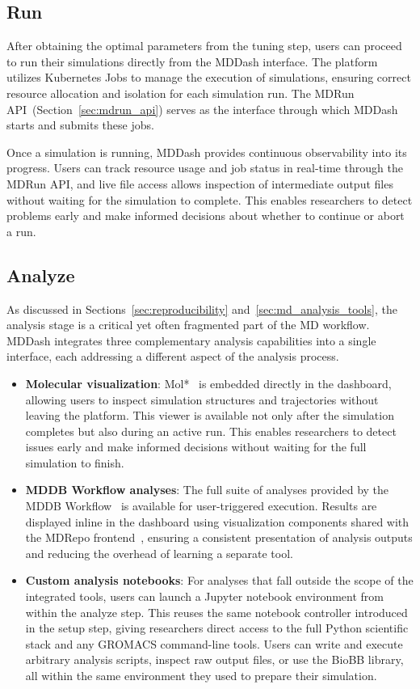 \documentclass[
  digital,     %
  color,       %
  oneside,     %
  nosansbold,  %
  nocolorbold, %
  lof,         %
  lot,         %
]{fithesis4}
\begin{document}
\subsection{Run}
\label{sec:step_run}

After obtaining the optimal parameters from the tuning step, users can proceed to run their simulations directly from the MDDash interface. The platform utilizes Kubernetes Jobs to manage the execution of simulations, ensuring correct resource allocation and isolation for each simulation run. The MDRun API~(Section~\ref{sec:mdrun_api}) serves as the interface through which MDDash starts and submits these jobs.

Once a simulation is running, MDDash provides continuous observability into its progress. Users can track resource usage and job status in real-time through the MDRun API, and live file access allows inspection of intermediate output files without waiting for the simulation to complete. This enables researchers to detect problems early and make informed decisions about whether to continue or abort a run.

\subsection{Analyze}
\label{sec:step_analyze}

As discussed in Sections~\ref{sec:reproducibility} and~\ref{sec:md_analysis_tools}, the analysis stage is a critical yet often fragmented part of the MD workflow. MDDash integrates three complementary analysis capabilities into a single interface, each addressing a different aspect of the analysis process.

\begin{itemize}
    \item \textbf{Molecular visualization}: Mol*~\cite{molstar_viewer} is embedded directly in the dashboard, allowing users to inspect simulation structures and trajectories without leaving the platform. This viewer is available not only after the simulation completes but also during an active run. This enables researchers to detect issues early and make informed decisions without waiting for the full simulation to finish.
    \item \textbf{MDDB Workflow analyses}: The full suite of analyses provided by the MDDB Workflow~\cite{mddb_covid} is available for user-triggered execution. Results are displayed inline in the dashboard using visualization components shared with the MDRepo frontend~\cite{mdrepo_ui}, ensuring a consistent presentation of analysis outputs and reducing the overhead of learning a separate tool.
    \item \textbf{Custom analysis notebooks}: For analyses that fall outside the scope of the integrated tools, users can launch a Jupyter notebook environment from within the analyze step. This reuses the same notebook controller introduced in the setup step, giving researchers direct access to the full Python scientific stack and any GROMACS command-line tools. Users can write and execute arbitrary analysis scripts, inspect raw output files, or use the BioBB library, all within the same environment they used to prepare their simulation.
\end{itemize}
\end{document}
